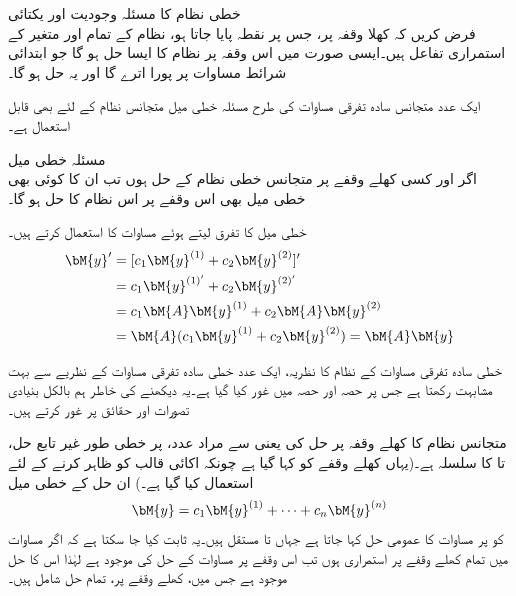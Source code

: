 \quad خطی نظام کا مسئلہ وجودیت اور یکتائی \\
فرض کریں کہ کھلا وقفہ  پر، جس پر نقطہ  پایا جاتا ہو،  نظام  کے تمام  اور  متغیر  کے استمراری  تفاعل ہیں۔ایسی صورت میں اس وقفہ پر نظام  کا ایسا حل   ہو گا جو ابتدائی شرائط مساوات  پر پورا اترے گا  اور  یہ حل  ہو گا۔

ایک عدد متجانس سادہ تفرقی مساوات کی طرح  مسئلہ خطی میل متجانس نظام کے لئے بھی قابل استعمال ہے۔ 

\quad مسئلہ خطی میل\\
اگر  اور  کسی کھلے وقفے پر متجانس خطی نظام  کے حل ہوں تب ان کا کوئی بھی خطی میل   بھی اس وقفے پر  اس نظام کا حل ہو گا۔ 

خطی میل  کا تفرق لیتے ہوئے مساوات  کا استعمال کرتے ہیں۔
\begin{align*}
\bM{y}'&=[c_1\bM{y}^{(1)}+c_2\bM{y}^{(2)}]'\\
&=c_1\bM{y}^{(1)'}+c_2\bM{y}^{(2)'}\\
&=c_1\bM{A}\bM{y}^{(1)}+c_2\bM{A}\bM{y}^{(2)}\\
&=\bM{A}(c_1\bM{y}^{(1)}+c_2\bM{y}^{(2)})=\bM{A}\bM{y}
\end{align*}

خطی سادہ تفرقی مساوات کے نظام کا نظریہ، ایک عدد خطی سادہ تفرقی مساوات کے نظریے سے بہت مشابہت رکھتا ہے جس پر حصہ  اور حصہ  میں غور کیا گیا ہے۔یہ دیکھنے کی خاطر ہم بالکل بنیادی تصورات اور حقائق پر غور کرتے ہیں۔ 

متجانس نظام  کا کھلے وقفہ  پر حل کی  یعنی  سے مراد  عدد،  پر خطی طور غیر تابع حل،  تا  کا سلسلہ ہے۔(یہاں کھلے وقفے کو  کہا گیا ہے چونکہ  اکائی قالب کو ظاہر کرنے کے لئے استعمال کیا گیا ہے۔) ان حل کے خطی میل
\begin{align}\label{مساوات_نظام_ورونسکی_الف}
\bM{y}=c_1\bM{y}^{(1)}+\cdots+c_n\bM{y}^{(n)}
\end{align}
کو  پر مساوات  کا عمومی حل کہا جاتا ہے جہاں  تا   مستقل ہیں۔یہ ثابت کیا جا سکتا ہے کہ اگر مساوات  میں تمام  کھلے وقفے پر استمراری ہوں تب اس وقفے پر مساوات  کے حل کی  موجود ہے لہٰذا اس کا  حل موجود ہے جس میں، کھلے وقفے پر، تمام حل شامل ہیں۔

